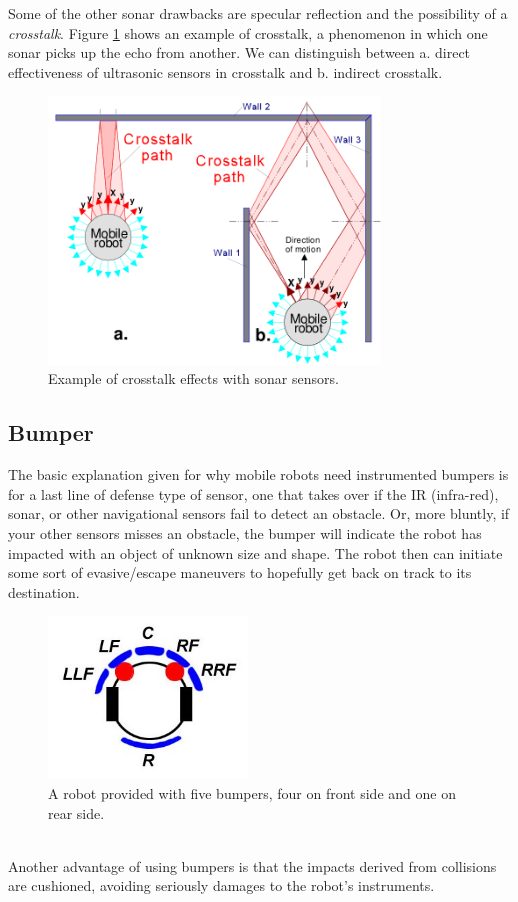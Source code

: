 Some of the other sonar drawbacks are
specular reflection and the possibility of a \textit{crosstalk}.
Figure \ref{fig:sonar_crosstalk} shows an example of crosstalk,
a phenomenon in which one sonar picks up the echo
from another. We can distinguish between a. direct effectiveness
of ultrasonic sensors in crosstalk and b. indirect crosstalk.
\begin{figure} [!h]
  \begin{center}
    \includegraphics[width=250pt]{img/sonar_crosstalk.png}
    \caption{Example of crosstalk effects with sonar sensors.}
    \label{fig:sonar_crosstalk}
  \end{center}
\end{figure}

\subsection{Bumper}
\label{intro:mobile:bumper}

The basic explanation given for why mobile robots need instrumented
bumpers is for a last line of defense type of sensor, one that takes
over if the IR (infra-red), sonar, or other navigational sensors fail
to detect an obstacle. Or, more bluntly, if your other sensors misses
an obstacle, the bumper will indicate the robot has impacted with an
object of unknown size and shape. The robot then can initiate some
sort of evasive/escape maneuvers to
hopefully get back on track to its destination.
\begin{figure} [!h]
  \begin{center}
    \includegraphics[width=200px]{img/bumpers.jpg}
    \caption{A robot provided with five bumpers, four on front
      side and one on rear side.}
    \label{fig:bumpers}
  \end{center}
\end{figure}
\\
Another advantage of using bumpers is that the impacts derived from
collisions are cushioned, avoiding seriously damages to the robot's
instruments.

